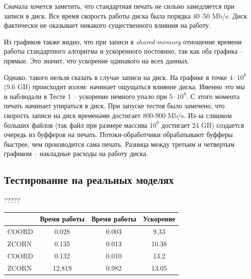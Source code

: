 Сначала хочется заметить, что стандартная печать не сильно замедляется при записи в диск. 
Все время скорость работы диска была порядка 40--50 Mb/s.
Диск фактически не оказывает никакого существенного влияния на работу.

Из графиков также видно, что при записи в \textit{shared-memory} отношение времени работы стандартного алгоритма и ускоренного постоянно, так как оба графика -- прямые.
Это значит, что ускорение одинакого на всех данных.

Однако, такого нельзя сказать в случае записи на диск.
На графике в точке $4 \cdot 10^8$ (9.6 GB) происходит излом: начинает ощущаться влияние диска. Именно это мы и наблюдали в Тесте 1 -- ускорение немного упало при $5 \cdot 10^8$.
С этого момента печать начинает упираться в диск.
При запуске тестов было замечено, что скорость записи на диск временами достигает 800-900 Mb/s.
Из-за слишком больших файлов (так файл при размере массива $10^9$ достигает 24 GB) создается очередь из буфферов на печать.
Потоки-обработчики обрабатывают буфферы быстрее, чем производится сама печать.
Разница между третьим и четвертым графиком -- накладные расходы на работу диска.

\subsection{Тестирование на реальных моделях}
?????

\vspace{10pt}

\begin{tabular}{||l||c|c|c||}
\hline
\hline
& Время работы & Время работы & Ускорение \\
\hline
\hline
COORD & 0.028 & 0.003 & 9.33 \\
\hline
ZCORN & 0.135 & 0.013 & 10.38 \\
\hline
COORD & 0.132 &  0.010 & 13.2 \\
\hline
ZCORN & 12.819 & 0.982 & 13.05 \\
\hline
\hline
\end{tabular}


